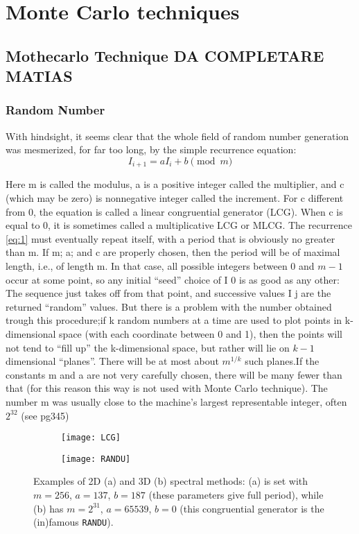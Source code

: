 \chapter{Monte Carlo techniques}\label{chap:2}


\section{Mothecarlo Technique DA COMPLETARE MATIAS}

\subsection{Random Number}
With hindsight, it seems clear that the whole field of random number generation
was mesmerized, for far too long, by the simple recurrence equation:
\begin{equation}
I_{i+1} = aI_{i} + b \pmod{m}
\label{eq:1}
\end{equation}


Here m is called the modulus, a is a positive integer called the multiplier, and c
(which may be zero) is nonnegative integer called the increment. For c different from 0, the equation is called a linear congruential generator (LCG). When c is equal to 0, it is sometimes
called a multiplicative LCG or MLCG.
The recurrence \ref{eq:1} must eventually repeat itself, with a period that is obviously no greater than m. If m; a; and c are properly chosen, then the period will be
of maximal length, i.e., of length m. In that case, all possible integers between 0 and
$m-1$ occur at some point, so any initial “seed” choice of I 0 is as good as any other:
The sequence just takes off from that point, and successive values I j are the returned
“random” values.
But there is a problem with the number obtained trough this procedure;if k random numbers at a time are used to plot points in k-dimensional space (with each coordinate between 0 and 1), then the points will not
tend to “fill up” the k-dimensional space, but rather will lie on $k-1$ dimensional
“planes”. There will be at most about $m^{1/k}$ such planes.If the constants m and a
are not very carefully chosen, there will be many fewer than that (for this reason this way is not used with Monte Carlo technique). The number m
was usually close to the machine’s largest representable integer, often $2^{32}$
(see pg345)
\begin{figure}[h!t]
\centering
\begin{subfigure}[ht]{0.45\textwidth}
	\centering
	\texttt{[image: LCG]}
	\caption{}\label{SpectralMethod2d}
\end{subfigure}
\hfill
\begin{subfigure}[ht]{0.51\textwidth}
	\centering
	\texttt{[image: RANDU]}
        \caption{}\label{SpectralMethod3d}
\end{subfigure}
\caption{ Examples of 2D (a) and 3D (b) spectral methods: (a) is set with $m=256$, $a=137$, $b=187$ (these parameters give full period), while (b) has $m=2^{31}$, $a=65539$, $b=0$ (this congruential generator is the (in)famous \texttt{RANDU}).}\label{SpectralMethod}
\end{figure}
